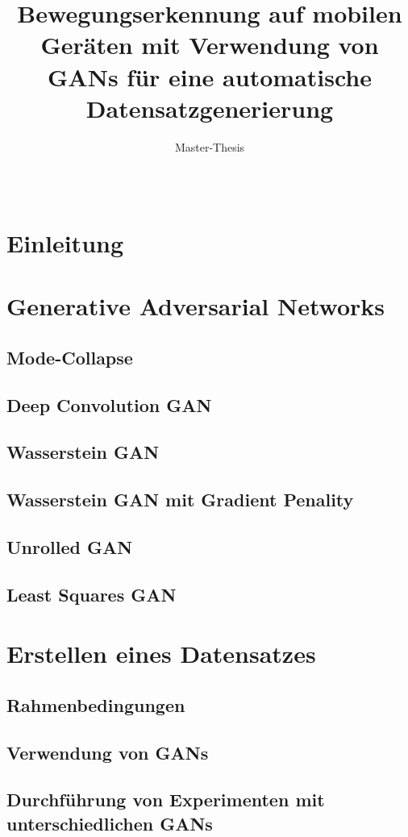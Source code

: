 \documentclass{hsflensburg}
\title{Bewegungserkennung auf mobilen Geräten mit Verwendung von GANs für eine automatische Datensatzgenerierung}
\subtitle{Master-Thesis}
\author{
  \name{Florian Hansen}\\
  \institution{Hochschule Flensburg}
}
\begin{document}
  \maketitle
  \tableofcontents

  \section{Einleitung}

  \section{Generative Adversarial Networks}
  \subsection{Mode-Collapse}
  \subsection{Deep Convolution GAN}
  \subsection{Wasserstein GAN}
  \subsection{Wasserstein GAN mit Gradient Penality}
  \subsection{Unrolled GAN}
  \subsection{Least Squares GAN}

  \section{Erstellen eines Datensatzes}
  \subsection{Rahmenbedingungen}
  \subsection{Verwendung von GANs}
  \subsection{Durchführung von Experimenten mit unterschiedlichen GANs}
\end{document}
